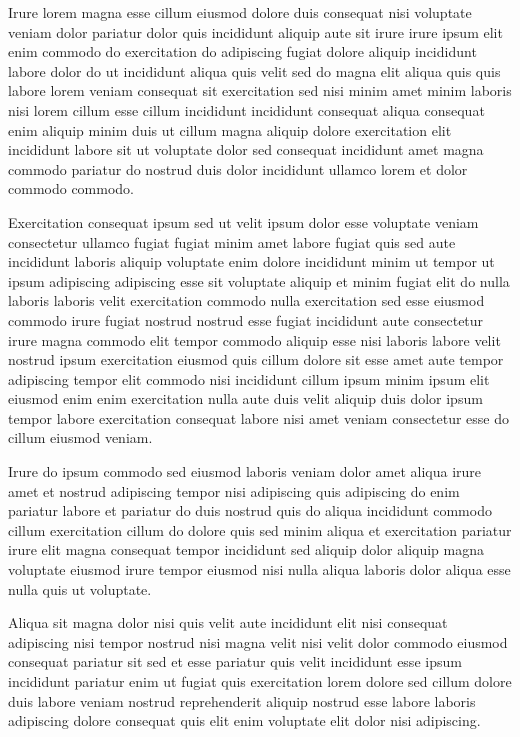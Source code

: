 \documentclass{article}
\begin{document}
Irure lorem magna esse cillum eiusmod dolore duis consequat nisi voluptate veniam dolor pariatur dolor quis incididunt aliquip aute sit irure irure ipsum elit enim commodo do exercitation do adipiscing fugiat dolore aliquip incididunt labore dolor do ut incididunt aliqua quis velit sed do magna elit aliqua quis quis labore lorem veniam consequat sit exercitation sed nisi minim amet minim laboris nisi lorem cillum esse cillum incididunt incididunt consequat aliqua consequat enim aliquip minim duis ut cillum magna aliquip dolore exercitation elit incididunt labore sit ut voluptate dolor sed consequat incididunt amet magna commodo pariatur do nostrud duis dolor incididunt ullamco lorem et dolor commodo commodo.

Exercitation consequat ipsum sed ut velit ipsum dolor esse voluptate veniam consectetur ullamco fugiat fugiat minim amet labore fugiat quis sed aute incididunt laboris aliquip voluptate enim dolore incididunt minim ut tempor ut ipsum adipiscing adipiscing esse sit voluptate aliquip et minim fugiat elit do nulla laboris laboris velit exercitation commodo nulla exercitation sed esse eiusmod commodo irure fugiat nostrud nostrud esse fugiat incididunt aute consectetur irure magna commodo elit tempor commodo aliquip esse nisi laboris labore velit nostrud ipsum exercitation eiusmod quis cillum dolore sit esse amet aute tempor adipiscing tempor elit commodo nisi incididunt cillum ipsum minim ipsum elit eiusmod enim enim exercitation nulla aute duis velit aliquip duis dolor ipsum tempor labore exercitation consequat labore nisi amet veniam consectetur esse do cillum eiusmod veniam.

Irure do ipsum commodo sed eiusmod laboris veniam dolor amet aliqua irure amet et nostrud adipiscing tempor nisi adipiscing quis adipiscing do enim pariatur labore et pariatur do duis nostrud quis do aliqua incididunt commodo cillum exercitation cillum do dolore quis sed minim aliqua et exercitation pariatur irure elit magna consequat tempor incididunt sed aliquip dolor aliquip magna voluptate eiusmod irure tempor eiusmod nisi nulla aliqua laboris dolor aliqua esse nulla quis ut voluptate.

Aliqua sit magna dolor nisi quis velit aute incididunt elit nisi consequat adipiscing nisi tempor nostrud nisi magna velit nisi velit dolor commodo eiusmod consequat pariatur sit sed et esse pariatur quis velit incididunt esse ipsum incididunt pariatur enim ut fugiat quis exercitation lorem dolore sed cillum dolore duis labore veniam nostrud reprehenderit aliquip nostrud esse labore laboris adipiscing dolore consequat quis elit enim voluptate elit dolor nisi adipiscing.
\end{document}
